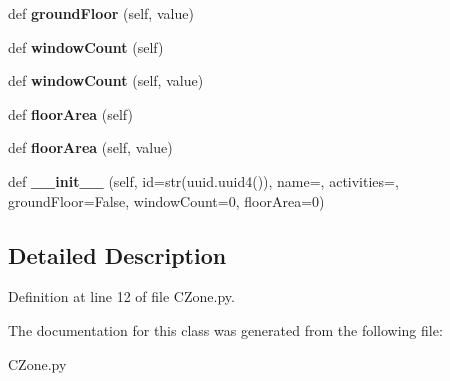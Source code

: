 \begin{DoxyCompactItemize}
def {\bfseries ground\+Floor} (self, value)
\item 
\mbox{\label{class_c_zone_1_1_c_zone_aa42303929133897776f13907e0431c0f}} 
def {\bfseries window\+Count} (self)
\item 
\mbox{\label{class_c_zone_1_1_c_zone_af3677ddf979f1265c118cfc443f1d331}} 
def {\bfseries window\+Count} (self, value)
\item 
\mbox{\label{class_c_zone_1_1_c_zone_abdc78e81ef4a07ee7ba9793bbf69af2c}} 
def {\bfseries floor\+Area} (self)
\item 
\mbox{\label{class_c_zone_1_1_c_zone_a576ae6723af0e4ea4336b50a2e6e2aaf}} 
def {\bfseries floor\+Area} (self, value)
\item 
\mbox{\label{class_c_zone_1_1_c_zone_acd55f81742453744a48338238ae1d0e2}} 
def {\bfseries \+\_\+\+\_\+init\+\_\+\+\_\+} (self, id=str(uuid.\+uuid4()), name=\textquotesingle{}\textquotesingle{}, activities=\textquotesingle{}\textquotesingle{}, ground\+Floor=False, window\+Count=0, floor\+Area=0)
\end{DoxyCompactItemize}


\subsection{Detailed Description}


Definition at line 12 of file C\+Zone.\+py.



The documentation for this class was generated from the following file\+:\begin{DoxyCompactItemize}
\item 
C\+Zone.\+py\end{DoxyCompactItemize}

